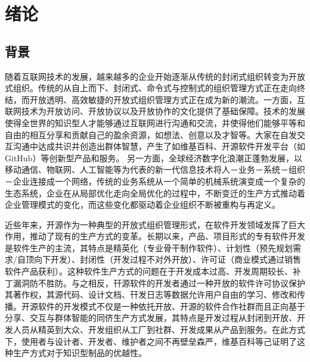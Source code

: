 
\section{绪论}
 
\subsection{背景}

\par 随着互联网技术的发展，越来越多的企业开始逐渐从传统的封闭式组织转变为开放式组织。传统的从自上而下、封闭式、命令式与控制式的组织管理方式正在走向终结，而开放透明、高效敏捷的开放式组织管理方式正在成为新的潮流。一方面，互联网技术为开放访问、开放协议以及开放协作的文化提供了基础保障。技术的发展使得全世界的知识型人才能够通过互联网进行沟通和交流，并使得他们能够平等和自由的相互分享和贡献自己的盈余资源，如想法、创意以及才智等。大家在自发交互沟通中达成共识并创造出群体智慧，产生了如维基百科、开源软件开发平台（如GitHub）等创新型产品和服务\cite{王璐2017开放式创新的协同演化机制研究}。 另一方面，全球经济数字化浪潮正蓬勃发展，以移动通信、物联网、人工智能等为代表的新一代信息技术将人－业务－系统－组织－企业连接成一个网络，传统的业务系统从一个简单的机械系统演变成一个复杂的生态系统，企业在从局部优化走向全局优化的过程中，不断变迁的生产方式推动着企业管理模式的变化，而这些变化都驱动着企业组织不断被重构与再定义。

\par 近些年来，开源作为一种典型的开放式组织管理形式，在软件开发领域发挥了巨大作用，推动了现有的生产方式的变革。长期以来，产品、项目形式的专有软件开发是软件生产的主流，其特点是精英化（专业骨干制作软件）、计划性（预先规划需求/自顶向下开发）、封闭性（开发过程不对外开放）、许可证（商业模式通过销售软件产品获利）。这种软件生产方式的问题在于开发成本过高、开发周期较长、补丁漏洞防不胜防。与之相反，幵源软件的开发者通过一种开放的软件许可协议保护其著作权，其源代码、设计文档、幵发日志等数据允许用户自由的学习、修改和传播。开源软件的开发模式不仅是一种依托开放、开源的软件合作社群而且正向基于分享、交互与群体智能的同侪生产方式发展，其特点是开发过程从封闭到开放、开发人员从精英到大众、开发组织从工厂到社群、开发成果从产品到服务。在此方式下，使用者与设计者、开发者、维护者之间不再壁垒森严，维基百科等己证明了这种生产方式对于知识型制品的优越性。\cite{李其锋2014面向开源社区的开发者群体行为分析方法}

